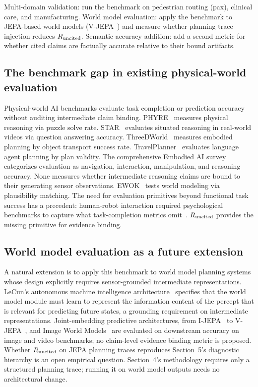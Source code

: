 Multi-domain validation: run the benchmark on pedestrian routing (pax), clinical care, and
manufacturing. World model evaluation: apply the benchmark to JEPA-based world models
(V-JEPA~\cite{arxiv240408471}) and measure whether planning trace injection reduces $R_{\mathrm{uncited}}$.
Semantic accuracy addition: add a second metric for whether cited claims are factually accurate
relative to their bound artifacts.

\subsection{The benchmark gap in existing physical-world evaluation}

Physical-world AI benchmarks evaluate task completion or prediction accuracy without auditing
intermediate claim binding. PHYRE~\cite{arxiv190805656} measures physical reasoning via puzzle
solve rate. STAR~\cite{arxiv240509711} evaluates situated reasoning in real-world videos via
question answering accuracy. ThreeDWorld~\cite{arxiv210314025} measures embodied planning by
object transport success rate. TravelPlanner~\cite{arxiv240201622} evaluates language agent
planning by plan validity. The comprehensive Embodied AI survey~\cite{arxiv240706886} categorizes
evaluation as navigation, interaction, manipulation, and reasoning accuracy. None measures whether
intermediate reasoning claims are bound to their generating sensor observations. EWOK~\cite{arxiv240509605}
tests world modeling via plausibility matching. The need for evaluation primitives beyond functional
task success has a precedent: human-robot interaction required psychological benchmarks to capture
what task-completion metrics omit~\cite{kahn2007benchmarks}. $R_{\mathrm{uncited}}$ provides the missing
primitive for evidence binding.

\subsection{World model evaluation as a future extension}

A natural extension is to apply this benchmark to world model planning systems whose design
explicitly requires sensor-grounded intermediate representations. LeCun's autonomous machine
intelligence architecture~\cite{arxiv230602572} specifies that the world model module must
learn to represent the information content of the percept that is relevant for predicting
future states, a grounding requirement on intermediate representations. Joint-embedding
predictive architectures, from I-JEPA~\cite{arxiv230108243} to V-JEPA~\cite{arxiv240408471}, and
Image World Models~\cite{arxiv240300504} are evaluated on downstream accuracy on image and video
benchmarks; no claim-level evidence binding metric is proposed.
Whether $R_{\mathrm{uncited}}$ on JEPA planning traces reproduces Section~5's diagnostic hierarchy is an open
empirical question. Section~4's methodology requires only a structured planning trace; running it on
world model outputs needs no architectural change.
